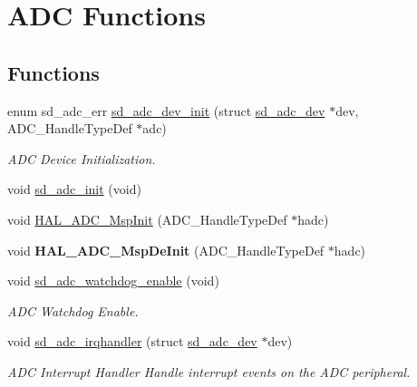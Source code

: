 \hypertarget{group___s_d___a_d_c___functions}{}\section{A\+DC Functions}
\label{group___s_d___a_d_c___functions}
\subsection*{Functions}
\begin{DoxyCompactItemize}
\item 
enum sd\+\_\+adc\+\_\+err \mbox{\hyperlink{group___s_d___a_d_c___functions_ga1189f478e64b9aeb4d4ebd4c73e0394e}{sd\+\_\+adc\+\_\+dev\+\_\+init}} (struct \mbox{\hyperlink{structsd__adc__dev}{sd\+\_\+adc\+\_\+dev}} $\ast$dev, A\+D\+C\+\_\+\+Handle\+Type\+Def $\ast$adc)
\begin{DoxyCompactList}\small\item\em A\+DC Device Initialization. \end{DoxyCompactList}\item 
void \mbox{\hyperlink{group___s_d___a_d_c___functions_ga1a0d46dabe915346e428a46b9f943879}{sd\+\_\+adc\+\_\+init}} (void)
\item 
void \mbox{\hyperlink{group___s_d___a_d_c___functions_gaa30863492d5c3103e3e8ce8a63dadd07}{H\+A\+L\+\_\+\+A\+D\+C\+\_\+\+Msp\+Init}} (A\+D\+C\+\_\+\+Handle\+Type\+Def $\ast$hadc)
\item 
\mbox{\label{group___s_d___a_d_c___functions_ga39b0f8e80268ab3e660ead921ad4b22f}} 
void {\bfseries H\+A\+L\+\_\+\+A\+D\+C\+\_\+\+Msp\+De\+Init} (A\+D\+C\+\_\+\+Handle\+Type\+Def $\ast$hadc)
\item 
void \mbox{\hyperlink{group___s_d___a_d_c___functions_ga78d41bf72512fd19ce879a78f158cb42}{sd\+\_\+adc\+\_\+watchdog\+\_\+enable}} (void)
\begin{DoxyCompactList}\small\item\em A\+DC Watchdog Enable. \end{DoxyCompactList}\item 
void \mbox{\hyperlink{group___s_d___a_d_c___functions_ga54804db19c825e0ec5e991ffa4f34123}{sd\+\_\+adc\+\_\+irqhandler}} (struct \mbox{\hyperlink{structsd__adc__dev}{sd\+\_\+adc\+\_\+dev}} $\ast$dev)
\begin{DoxyCompactList}\small\item\em A\+DC Interrupt Handler Handle interrupt events on the A\+DC peripheral. \end{DoxyCompactList}\item 

\end{DoxyCompactItemize}
